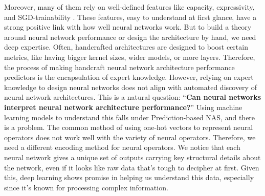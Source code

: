 \documentclass[lettersize,journal]{IEEEtran}
\begin{document}
Moreover, many of them rely on well-defined features like capacity, expressivity, and SGD-trainability \cite{naswot, Zen-NAS, TE-NAS}. These features, easy to understand at first glance, have a strong positive link with how well neural networks work. But to build a theory around neural network performance or design the architecture by hand, we need deep expertise. Often, handcrafted architectures are designed to boost certain metrics, like having bigger kernel sizes, wider models, or more layers. Therefore, the process of making handcraft neural network architecture performance predictors is the encapsulation of expert knowledge. However, relying on expert knowledge to design neural networks does not align with automated discovery of neural network architectures. This is a natural question: ``\textbf{Can neural networks interpret neural network architecture performance?}'' Using machine learning models to understand this falls under Prediction-based NAS, and there is a problem. The common method of using one-hot vectors to represent neural operators does not work well with the variety of neural operators. Therefore, we need a different encoding method for neural operators. We notice that each neural network gives a unique set of outputs carrying key structural details about the network, even if it looks like raw data that's tough to decipher at first. Given this, deep learning shows promise in helping us understand this data, especially since it's known for processing complex information.
\end{document}
